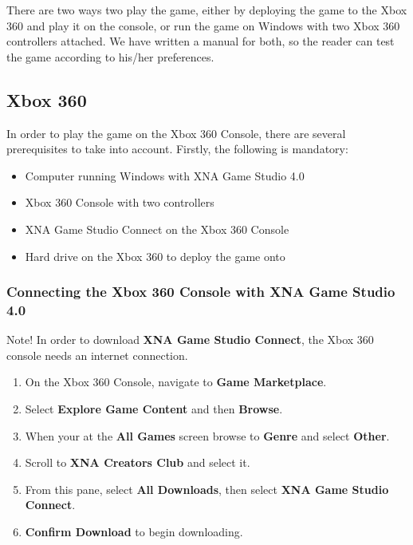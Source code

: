 There are two ways two play the game, either by deploying the game to the Xbox 360 and play it on the console, or 
run the game on Windows with two Xbox 360 controllers attached. We have written a manual for both, so the reader can 
test the game according to his/her preferences. 

\subsection{Xbox 360}

In order to play the game on the Xbox 360 Console, there are several prerequisites to take into account. Firstly, 
the following is mandatory\cite{deploy}:

\begin{itemize}
	\item Computer running Windows with XNA Game Studio 4.0 
	\item Xbox 360 Console with two controllers
	\item XNA Game Studio Connect on the Xbox 360 Console 
	\item Hard drive on the Xbox 360 to deploy the game onto 
\end{itemize}

\subsubsection{Connecting the Xbox 360 Console with XNA Game Studio 4.0}

Note! In order to download \textbf{XNA Game Studio Connect}, the Xbox 360 console needs an internet connection. \\

\begin{enumerate}
	\item On the Xbox 360 Console, navigate to \textbf{Game Marketplace}.
	\item Select \textbf{Explore Game Content} and then \textbf{Browse}. 
	\item When your at the \textbf{All Games} screen browse to \textbf{Genre} and select \textbf{Other}. 
	\item Scroll to \textbf{XNA Creators Club} and select it. 
	\item From this pane, select \textbf{All Downloads}, then select \textbf{XNA Game Studio Connect}. 
	\item \textbf{Confirm Download} to begin downloading. 
\end{enumerate}


